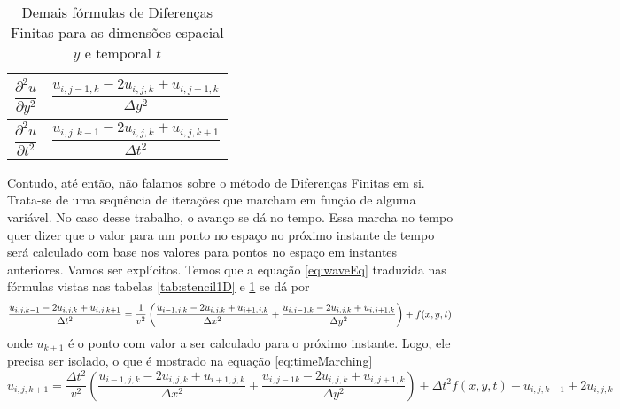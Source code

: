 	\begin{table}[H]
		\centering
		\caption{Demais fórmulas de Diferenças Finitas para as dimensões
			espacial $y$ e temporal $t$}
		\begin{tabular}{c|c}
			\hline
			$\dfrac{\partial^2 u}{\partial y^2}$ & $\dfrac{u_{i,j-1,k} - 2u_{i,j,k} + 
				u_{i,j+1,k}}{\Delta y^2}$ \\ \hline
			$\dfrac{\partial^2 u}{\partial t^2}$ & $\dfrac{u_{i,j,k-1} - 2u_{i,j,k} + 
				u_{i,j,k+1}}{\Delta t^2}$ \\ \hline
		\end{tabular}
		\label{tab:stencils3D}
	\end{table}
	
	
	Contudo, até então, não falamos sobre o método de Diferenças Finitas 
	em si. Trata-se de uma sequência de iterações que marcham em função de
	alguma variável. No caso desse trabalho, o avanço se dá no tempo. Essa marcha no tempo quer dizer que o valor para um ponto no espaço no próximo instante de tempo será calculado com base nos valores para pontos no espaço em instantes anteriores. Vamos ser explícitos. Temos que a equação \ref{eq:waveEq} traduzida nas fórmulas vistas nas tabelas 
	\ref{tab:stencil1D} e \ref{tab:stencils3D} se dá por
	\begin{equation}
		 \dfrac{u_{i,j,k-1} - 2u_{i,j,k} + u_{i,j,k+1}}{\Delta t^2} = \dfrac{1}{v^2}
			 \left(\dfrac{u_{i-1,j,k} - 2u_{i,j,k} + \\u_{i+1,j,k}}{\Delta x^2} + 
			 \dfrac{u_{i,j-1,k} - 2u_{i,j,k} + u_{i,j+1,k}}{\Delta y^2}\right) + f(x, y, t)
	\end{equation}
	onde $u_{k+1}$ é o ponto com valor a ser calculado para o próximo
	instante. Logo, ele precisa ser isolado, o que é mostrado na equação 
	\ref{eq:timeMarching}
	\begin{equation}
		\label{eq:timeMarching}
		u_{i, j,k+1} = \dfrac{\Delta t^2}{v^2}
		\left(\dfrac{u_{i-1,j,k} - 2u_{i,j,k} + u_{i+1,j,k}}{\Delta x^2} + 
		\dfrac{u_{i,j-1k} - 2u_{i,j,k} + u_{i,j+1,k}}{\Delta y^2}\right) + \Delta t^2f(x, y, t) - u_{i,j,k-1} + 2u_{i,j,k}
	\end{equation}
